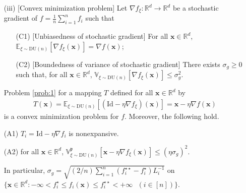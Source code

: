 \documentclass[smallextended,referee,envcountsect,]{svjour3}
\begin{document}
\begin{example}
\begin{enumerate}
\item[(iii)] [Convex minimization problem] Let $\nabla f_\xi \colon \mathbb{R}^d \to \mathbb{R}^d$ be a stochastic gradient of $f = \frac{1}{n} \sum_{i=1}^n f_i$ such that 
\begin{enumerate}
\item[(C1)] [Unbiasedness of stochastic gradient] For all $\bm{x} \in \mathbb{R}^d$, $\mathbb{E}_{\xi \sim \mathrm{DU}(n)} [\nabla f_\xi (\bm{x})] = \nabla f (\bm{x})$;
\item[(C2)]
[Boundedness of variance of stochastic gradient] There exists $\sigma_g \geq 0$ such that, for all $\bm{x} \in \mathbb{R}^{d}$, $\mathbb{V}_{\xi \sim \mathrm{DU}(n)}[\nabla f_{\xi}(\bm{x})] \leq \sigma_g^{2}$.
\end{enumerate} 
Problem \ref{prob:1} for a mapping $T$ defined for all $\bm{x} \in \mathbb{R}^d$ by
\begin{align}\label{convex_t}
T (\bm{x})
= 
\mathbb{E}_{\xi \sim \mathrm{DU}(n)} [(\mathrm{Id} - \eta \nabla f_\xi) (\bm{x})]
= \bm{x} - \eta \nabla f(\bm{x})
\end{align}
is a convex minimization problem for $f$. Moreover, the following hold.

{(A1)} $T_i = \mathrm{Id} - \eta \nabla f_i$ is nonexpansive.

{(A2)} for all $\bm{x} \in \mathbb{R}^d$, $\mathbb{V}_{\xi \sim \mathrm{DU}(n)}^{\mathfrak{p}}[\bm{x} - \eta \nabla f_\xi (\bm{x})] \leq (\eta \sigma_g)^{2}$.

In particular, $\sigma_g = \sqrt{ (2/n) \sum_{i=1}^n (f_i^{\star\star} - f_i^{\star}) L_i^{-1}}$ on $\{ \bm{x} \in \mathbb{R}^d \colon - \infty < f_i^\star \leq f_i (\bm{x}) \leq f_i^{\star\star} < + \infty \text{ } (i\in [n])\}$.
\end{enumerate} 
\end{example}
\end{document}
